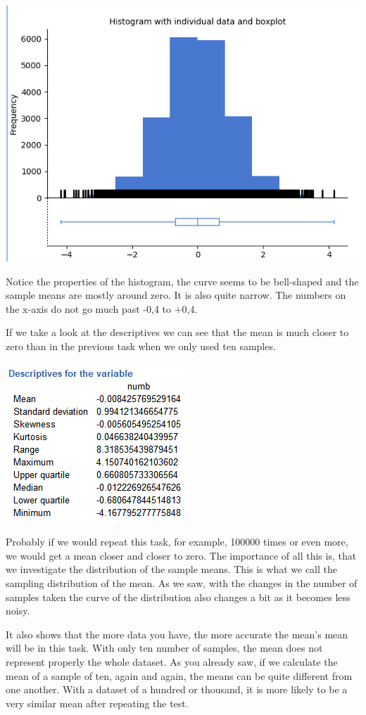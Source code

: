 \documentclass[
]{book}
\begin{document}
\includegraphics{img/ch4/4.6samplemeanshisto(moretrials).png}

Notice the properties of the histogram, the curve seems to be bell-shaped and the sample means are mostly around zero. It is also quite narrow. The numbers on the x-axis do not go much past -0,4 to +0,4.

If we take a look at the descriptives we can see that the mean is much closer to zero than in the previous task when we only used ten samples.

\includegraphics{img/ch4/4.6samplemeansdescriptives(more).png}

Probably if we would repeat this task, for example, 100000 times or even more, we would get a mean closer and closer to zero. The importance of all this is, that we investigate the distribution of the sample means. This is what we call the sampling distribution of the mean. As we saw, with the changes in the number of samples taken the curve of the distribution also changes a bit as it becomes less noisy.

It also shows that the more data you have, the more accurate the mean's mean will be in this task. With only ten number of samples, the mean does not represent properly the whole dataset. As you already saw, if we calculate the mean of a sample of ten, again and again, the means can be quite different from one another. With a dataset of a hundred or thousand, it is more likely to be a very similar mean after repeating the test.
\end{document}
